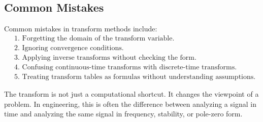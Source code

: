 \subsection*{Common Mistakes}

\begin{conceptbox}
    Common mistakes in transform methods include:
    \[
        \begin{aligned}
             & \text{1. Forgetting the domain of the transform variable.}                         \\
             & \text{2. Ignoring convergence conditions.}                                         \\
             & \text{3. Applying inverse transforms without checking the form.}                   \\
             & \text{4. Confusing continuous-time transforms with discrete-time transforms.}      \\
             & \text{5. Treating transform tables as formulas without understanding assumptions.}
        \end{aligned}
    \]
\end{conceptbox}

\begin{noteBox}
    The transform is not just a computational shortcut. It changes the viewpoint of a problem. In engineering, this is often the difference between analyzing a signal in time and analyzing the same signal in frequency, stability, or pole-zero form.
\end{noteBox}
